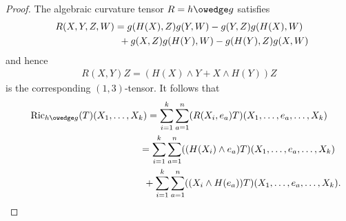 \documentclass[pdftex]{sigma}
\numberwithin{equation}{section}
\newcommand{\Ric} {\operatorname{Ric}}
\begin{document}
\begin{proof}The algebraic curvature tensor $R = h \owedge g$ satisfies
\begin{gather*}
R(X,Y,Z,W) =  g(H(X),Z)g(Y,W)-g(Y,Z)g(H(X),W) \\
\hphantom{R(X,Y,Z,W) =}{} +g(X,Z)g(H(Y),W)-g(H(Y),Z)g(X,W)
\end{gather*}
and hence
\begin{gather*}
R(X,Y)Z =  ( H(X) \wedge Y + X \wedge H(Y)  ) Z
\end{gather*}
is the corresponding $(1,3)$-tensor. It follows that
\begin{gather*}
\Ric_{h \owedge g}(T)(X_1, \dots, X_k) =   \sum_{i=1}^k \sum_{a=1}^n  ( R(X_i, e_a)T  ) ( X_1, \dots, e_a, \dots, X_k) \\
\hphantom{\Ric_{h \owedge g}(T)(X_1, \dots, X_k)}{} =   \sum_{i=1}^k \sum_{a=1}^n (( H(X_i) \wedge e_a )T)( X_1, \dots, e_a, \dots, X_k) \\
\hphantom{\Ric_{h \owedge g}(T)(X_1, \dots, X_k)=}{}  + \sum_{i=1}^k \sum_{a=1}^n (( X_i \wedge H(e_a) )T)( X_1, \dots, e_a, \dots, X_k).
\end{gather*}


\end{proof}
\end{document}
